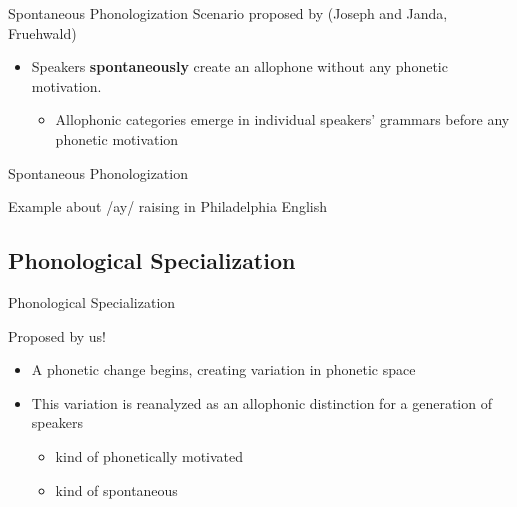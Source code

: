 \documentclass[hyperref={pdfpagelabels=false}]{beamer}
\begin{document}
\begin{frame}{Spontaneous Phonologization}
	Scenario proposed by (Joseph and Janda, Fruehwald) 
	
	\begin{itemize}
		\item Speakers \textbf{spontaneously} create an allophone without any phonetic motivation.  \\
		\begin{itemize}
			\item Allophonic categories emerge in individual speakers' grammars before any phonetic motivation
		\end{itemize}
	\end{itemize}

\end{frame}

\begin{frame}{Spontaneous Phonologization}

	Example about /ay/ raising in Philadelphia English

\end{frame}

\subsection{Phonological Specialization}

\begin{frame}{Phonological Specialization}

	Proposed by us!
	\begin{itemize}
		\item A phonetic change begins, creating variation in phonetic space
		\item This variation is reanalyzed as an allophonic distinction for a generation of speakers
		\begin{itemize}
				\item kind of phonetically motivated
				\item kind of spontaneous
		\end{itemize}
	\end{itemize}

\end{frame}
\end{document}
